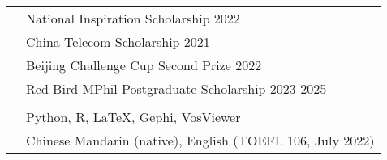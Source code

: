 \documentclass[letterpaper, 11pt]{article}
\begin{document}
\begin{longtable}{p{1.3in}p{4.8in}}




{\color{RoyalBlue}{Selected Honors }} 
&  National Inspiration Scholarship  \hfill 2022\\
{\color{RoyalBlue}{and Scholarships}} 
& China Telecom Scholarship \hfill 2021 \\
& Beijing Challenge Cup Second Prize \hfill 2022 \\
& Red Bird MPhil Postgraduate Scholarship \hfill 2023-2025 \\
& \\


{\color{RoyalBlue}{Skills}} 
&Python, R, LaTeX, Gephi, VosViewer\\

{\color{RoyalBlue}{Languages}} 
&Chinese Mandarin (native), English (TOEFL 106, July 2022) \\




\end{longtable}
\end{document}
